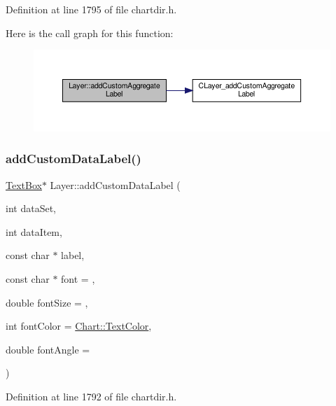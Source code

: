Definition at line 1795 of file chartdir.\+h.

Here is the call graph for this function\+:
\nopagebreak
\begin{figure}[H]
\begin{center}
\leavevmode
\includegraphics[width=350pt]{class_layer_a976d43d07961d45ecc945fdcbeba0e66_cgraph}
\end{center}
\end{figure}
\mbox{\label{class_layer_a8daa0b0f20efaca09d39862f1d2907d3}} 
\subsubsection{\texorpdfstring{add\+Custom\+Data\+Label()}{addCustomDataLabel()}}
{\footnotesize\ttfamily \hyperlink{class_text_box}{Text\+Box}$\ast$ Layer\+::add\+Custom\+Data\+Label (\begin{DoxyParamCaption}\item[{int}]{data\+Set,  }\item[{int}]{data\+Item,  }\item[{const char $\ast$}]{label,  }\item[{const char $\ast$}]{font = {},  }\item[{double}]{font\+Size = {},  }\item[{int}]{font\+Color = {\ttfamily \hyperlink{namespace_chart_abee0d882fdc9ad0b001245ad9fc64011a879e14f2f5024caccc047374342321ef}{Chart\+::\+Text\+Color}},  }\item[{double}]{font\+Angle = {} }\end{DoxyParamCaption})\hspace{0.3cm}{\ttfamily [inline]}}



Definition at line 1792 of file chartdir.\+h.


